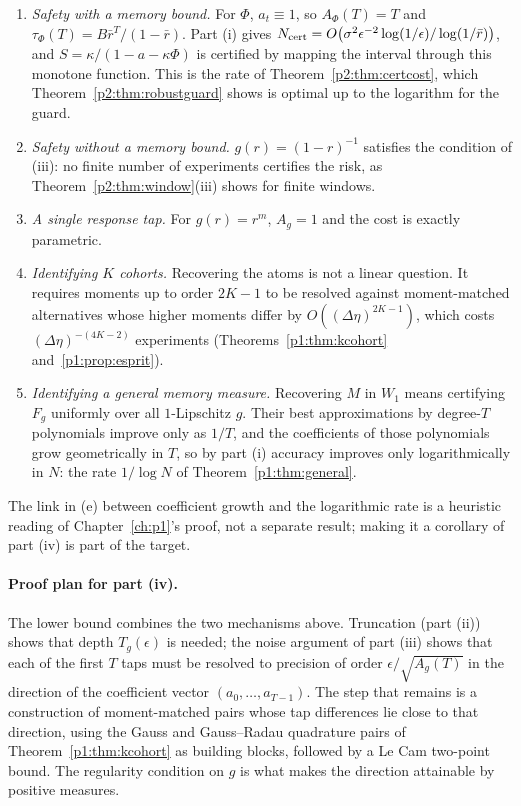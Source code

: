 \begin{corollary}\label{cor:cases}
\begin{enumerate}[label=(\alph*)]
\item \emph{Safety with a memory bound.} For $\Phi$, $a_t\equiv1$, so $A_\Phi(T)=T$ and $\tau_\Phi(T)=B\bar r^T/(1-\bar r)$. Part (i) gives $N_{\rm cert}=O\bigl(\sigma^2\epsilon^{-2}\log(1/\epsilon)/\log(1/\bar r)\bigr)$, and $S=\kappa/(1-a-\kappa\Phi)$ is certified by mapping the interval through this monotone function. This is the rate of Theorem~\ref{p2:thm:certcost}, which Theorem~\ref{p2:thm:robustguard} shows is optimal up to the logarithm for the guard. \hfill{}
\item \emph{Safety without a memory bound.} $g(r)=(1-r)^{-1}$ satisfies the condition of (iii): no finite number of experiments certifies the risk, as Theorem~\ref{p2:thm:window}(iii) shows for finite windows. \hfill{}
\item \emph{A single response tap.} For $g(r)=r^m$, $A_g=1$ and the cost is exactly parametric. \hfill\Proved
\item \emph{Identifying $K$ cohorts.} Recovering the atoms is not a linear question. It requires moments up to order $2K-1$ to be resolved against moment-matched alternatives whose higher moments differ by $O((\Delta\eta)^{2K-1})$, which costs $(\Delta\eta)^{-(4K-2)}$ experiments (Theorems~\ref{p1:thm:kcohort} and~\ref{p1:prop:esprit}). \hfill{}
\item \emph{Identifying a general memory measure.} Recovering $M$ in $W_1$ means certifying $F_g$ uniformly over all $1$-Lipschitz $g$. Their best approximations by degree-$T$ polynomials improve only as $1/T$, and the coefficients of those polynomials grow geometrically in $T$, so by part (i) accuracy improves only logarithmically in $N$: the rate $1/\log N$ of Theorem~\ref{p1:thm:general}. \hfill{}
\end{enumerate}
\end{corollary}

The link in (e) between coefficient growth and the logarithmic rate is a heuristic reading of Chapter~\ref{ch:p1}'s proof, not a separate result; making it a corollary of part (iv) is part of the target.

\paragraph{Proof plan for part (iv).} The lower bound combines the two mechanisms above. Truncation (part (ii)) shows that depth $T_g(\epsilon)$ is needed; the noise argument of part (iii) shows that each of the first $T$ taps must be resolved to precision of order $\epsilon/\sqrt{A_g(T)}$ in the direction of the coefficient vector $(a_0,\dots,a_{T-1})$. The step that remains is a construction of moment-matched pairs whose tap differences lie close to that direction, using the Gauss and Gauss--Radau quadrature pairs of Theorem~\ref{p1:thm:kcohort} as building blocks, followed by a Le Cam two-point bound. The regularity condition on $g$ is what makes the direction attainable by positive measures.

